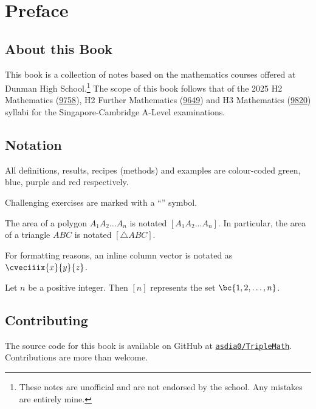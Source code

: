 \chapter*{Preface}

\section*{About this Book}

This book is a collection of notes  based on the mathematics courses offered at Dunman High School.\footnote{These notes are unofficial and are not endorsed by the school. Any mistakes are entirely mine.} The scope of this book follows that of the 2025 H2 Mathematics (\href{https://www.seab.gov.sg/files/A%20Level%20Syllabus%20Sch%20Cddts/2025/8865_y25_sy.pdf}{9758}), H2 Further Mathematics (\href{https://www.seab.gov.sg/files/A%20Level%20Syllabus%20Sch%20Cddts/2025/9649_y25_sy.pdf}{9649}) and H3 Mathematics (\href{https://www.seab.gov.sg/files/A%20Level%20Syllabus%20Sch%20Cddts/2025/9820_y25_sy.pdf}{9820}) syllabi for the Singapore-Cambridge A-Level examinations.

\section*{Notation}

All definitions, results, recipes (methods) and examples are colour-coded green, blue, purple and red respectively. 

Challenging exercises are marked with a ``\chili'' symbol.

The area of a polygon $A_1 A_2 \dots A_n$ is notated $[A_1 A_2 \dots A_n]$. In particular, the area of a triangle $ABC$ is notated $[\triangle ABC]$.

For formatting reasons, an inline column vector is notated as $\cveciiix{x}{y}{z}$.

Let $n$ be a positive integer. Then $[n]$ represents the set $\bc{1, 2, \dots, n}$.

\section*{Contributing}

The source code for this book is available on GitHub at \href{https://github.com/asdia0/TripleMath}{\texttt{asdia0/TripleMath}}. Contributions are more than welcome.